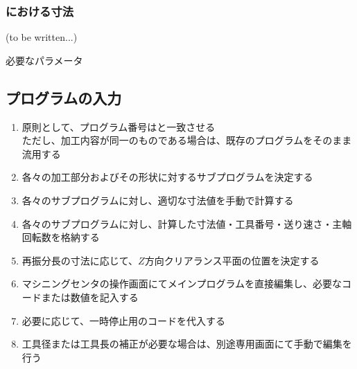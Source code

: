 \subsubsection{\EndFaceBoring における寸法\TBW}
(to be written...)
\begin{Parameter}{必要なパラメータ}
\PMEndFaceBoringCornerR
{}\\
\PMACOD
\end{Parameter}


\clearpage
\subsection{プログラムの入力}
\begin{enumerate}
\item 原則として、プログラム番号は\DrawingExists と一致させる\\
ただし、加工内容が同一のものである場合は、既存のプログラムをそのまま流用する
\item 各々の加工部分およびその形状に対するサブプログラムを決定する
\item 各々のサブプログラムに対し、適切な寸法値を手動で計算する
\item 各々のサブプログラムに対し、計算した寸法値・工具番号・送り速さ・主軸回転数を格納する
\item {}再振分長の寸法に応じて、$Z$方向クリアランス平面の位置を決定する
\item マシニングセンタの操作画面にてメインプログラムを直接編集し、必要なコードまたは数値を記入する
\item 必要に応じて、一時停止用のコードを代入する
\item {}工具径または工具長の補正が必要な場合は、別途専用画面にて手動で編集を行う
\end{enumerate}


